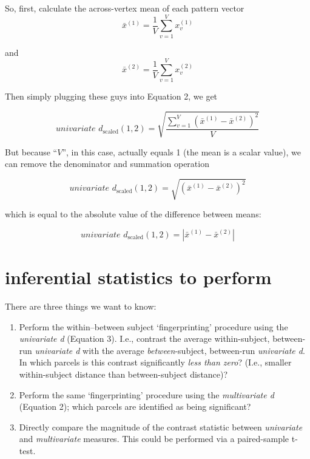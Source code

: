 \documentclass[]{article}
\begin{document}
So, first, calculate the across-vertex mean of each pattern vector
\[
\bar{x}^{(1)} = \frac{1}{V} \sum_{v = 1}^{V}{x}_v^{(1)}
\]

and 
\[
\bar{x}^{(2)} = \frac{1}{V} \sum_{v = 1}^{V}{x}_v^{(2)}
\]

Then simply plugging these guys into Equation 2, we get

\[
\textit{univariate d}_{\text{scaled}}(1, 2) = \sqrt{\frac{\sum_{v = 1}^{V}(\bar{x}^{(1)} - \bar{x}^{(2)})^2}{V}}
\]

But because ``$V$'', in this case, actually equals 1 (the mean is a scalar value), we can remove the denominator and summation operation

\[
\textit{univariate d}_{\text{scaled}}(1, 2) = \sqrt{(\bar{x}^{(1)} - \bar{x}^{(2)})^2}
\]

which is equal to the absolute value of the difference between means:

\begin{equation}
	\textit{univariate d}_{\text{scaled}}(1, 2) = |\bar{x}^{(1)} - \bar{x}^{(2)}|
\end{equation}


\section*{inferential statistics to perform}


There are three things we want to know:
\begin{enumerate}
	\item Perform the within--between subject `fingerprinting' procedure using the \textit{univariate d} (Equation 3). I.e., contrast the average within-subject, between-run \textit{univariate d} with the average \textit{between}-subject, between-run \textit{univariate d}.
	In which parcels is this contrast significantly \textit{less than zero}? (I.e., smaller within-subject distance than between-subject distance)?
	\item Perform the same `fingerprinting' procedure using the \textit{multivariate d} (Equation 2); which parcels are identified as being significant?
	\item Directly compare the magnitude of the contrast statistic between \textit{univariate} and \textit{multivariate} measures.
	This could be performed via a paired-sample t-test.
\end{enumerate}
\end{document}
